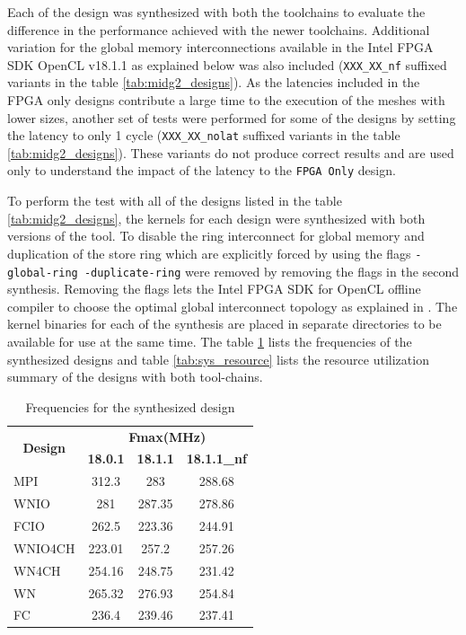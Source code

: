 Each of the design was synthesized with both the toolchains to evaluate the difference in the performance
achieved with the newer toolchains. Additional variation for the global memory interconnections available
in the Intel FPGA SDK OpenCL v18.1.1 as explained below was also included (\texttt{XXX\_XX\_nf}
suffixed variants in the table \ref{tab:midg2_designs}).
As the latencies included in the FPGA only designs contribute
a large time to the execution of the meshes with lower sizes, another set of
tests were performed for some of the designs by setting the latency to only 1 cycle
(\texttt{XXX\_XX\_nolat} suffixed variants in the table \ref{tab:midg2_designs}).
These variants do not produce correct results and are used only to understand the
impact of the latency to the \texttt{FPGA Only} design.

To perform the test with all of the designs listed in the table \ref{tab:midg2_designs},
the kernels for each design were synthesized with both versions of the tool. To disable
the ring interconnect for global memory and duplication of the store ring
which are explicitly forced by using the flags \texttt{-global-ring -duplicate-ring}
were removed by removing the flags in the second synthesis. Removing the flags
lets the Intel FPGA SDK for OpenCL offline compiler to choose the optimal global
interconnect topology as explained in \cite{noauthor_intel_2019_prog, section 7.16 and 7.17}.
The kernel binaries for each of the synthesis are placed in separate directories
to be available for use at the same time. The table \ref{tab:syn_freq} lists the
frequencies of the synthesized designs and table \ref{tab:sys_resource}
lists the resource utilization summary of the designs with both tool-chains.

\begin{table}[ht]
    \centering
    \caption{Frequencies for the synthesized design }
    \label{tab:syn_freq}
    \begin{tabular}{lccc}
    \multicolumn{1}{c}{\multirow{2}{*}{\textbf{Design}}} & \multicolumn{3}{c}{\textbf{Fmax(MHz)}} \\
    \cline{2-4}
    \multicolumn{1}{c}{} & \textbf{18.0.1} & \textbf{18.1.1} & \textbf{18.1.1\_nf} \\
    \hline
    MPI & 312.3 & 283 & 288.68 \\
    WNIO & 281 & 287.35 & 278.86 \\
    FCIO & 262.5 & 223.36 & 244.91 \\
    WNIO4CH & 223.01 & 257.2 & 257.26 \\
    WN4CH & 254.16 & 248.75 & 231.42 \\
    WN & 265.32 & 276.93 & 254.84 \\
    FC & 236.4 & 239.46 & 237.41 \\
    \hline
    \end{tabular}%
\end{table}



